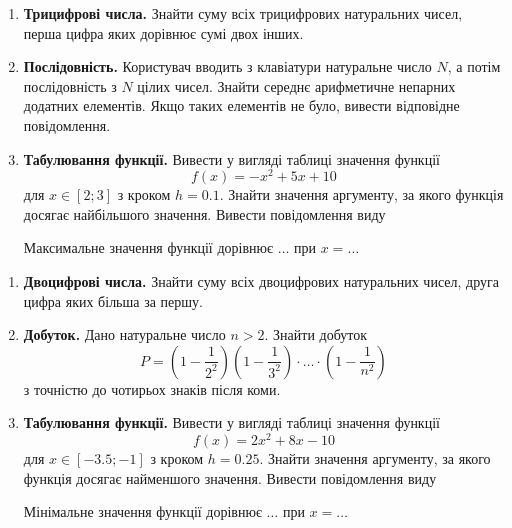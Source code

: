 \begin{enumerate}
\item \textbf{Трицифрові числа.} Знайти суму всіх трицифрових натуральних чисел, перша цифра яких дорівнює сумі двох інших.
\item \textbf{Послідовність.} Користувач вводить з клавіатури натуральне число $N$, а потім по\-слі\-до\-вність з $N$ цілих чисел. Знайти середнє арифметичне непарних додатних елементів. Якщо таких елементів не було, вивести відповідне повідомлення.
\item \textbf{Табулювання функції.} Вивести у вигляді таблиці значення функції
$$
f(x)=-x^2+5x+10
$$
для $ x \in [2; 3] $ з кроком $ h = 0.1 $. Знайти значення аргументу, за якого функція досягає найбільшого значення. Вивести повідомлення виду

 {\ttfamily\color{blue} Максимальне значення функції дорівнює $\ldots$  при  $x = \ldots $ }
\end{enumerate}


 


\begin{enumerate}
\item \textbf{Двоцифрові числа.} Знайти суму всіх двоцифрових натуральних чисел, друга цифра яких більша за першу.
\item \textbf{Добуток.} Дано натуральне число $n>2$. Знайти добуток
$$
P=\left(1-\frac{1}{2^2}\right)\left(1-\frac{1}{3^2}\right)\cdot\ldots\cdot\left(1-\frac{1}{n^2}\right)
$$
з точністю до чотирьох знаків після коми.
\item \textbf{Табулювання функції.} Вивести у вигляді таблиці значення функції
$$
f(x)=2x^2+8x-10
$$
для $ x \in [-3.5; -1]$ з кроком $h=0.25$. Знайти значення аргументу, за якого функція досягає найменшого значення. Вивести повідомлення виду

 {\ttfamily\color{blue} Мінімальне значення функції дорівнює $\ldots$  при  $x = \ldots $ }
\end{enumerate}


 


